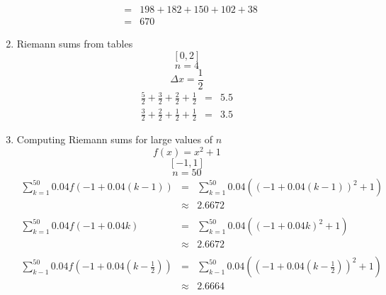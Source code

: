 \documentclass{article}
\begin{document}
\begin{enumerate}
\begin{eqnarray}
                                                      &=& 198 + 182 + 150 + 102 + 38 \\
                                                      &=& 670
            \end{eqnarray}
        \item Riemann sums from tables
            $$[0,2]$$
            $$n = 4$$
            $$\Delta{x} = \frac{1}{2}$$
            \begin{eqnarray}
                \frac{5}{2} + \frac{3}{2} + \frac{2}{2} + \frac{1}{2} &=& 5.5 \\
                \frac{3}{2} + \frac{2}{2} + \frac{1}{2} + \frac{1}{2} &=& 3.5
            \end{eqnarray}
        \item Computing Riemann sums for large values of $n$
            $$f(x) = x^2 + 1$$
            $$[-1, 1]$$
            $$n = 50$$
            \begin{eqnarray}
                \sum_{k = 1}^{50}{0.04f\left(-1 + 0.04\left(k - 1\right)\right)} &=& \sum_{k = 1}^{50}{0.04\left(\left(-1 + 0.04\left(k - 1\right)\right)^2 + 1\right)} \\
                                                                                 &\approx& 2.6672 \\
                                                                                 \nonumber \\
                \sum_{k = 1}^{50}{0.04f\left(-1 + 0.04k\right)} &=& \sum_{k = 1}^{50}{0.04\left(\left(-1 + 0.04k\right)^2 + 1\right)} \\
                                                                &\approx& 2.6672 \\
                                                                \nonumber \\
                \sum_{k - 1}^{50}{0.04f\left(-1 + 0.04\left(k - \frac{1}{2}\right)\right)} &=& \sum_{k - 1}^{50}{0.04\left(\left(-1 + 0.04\left(k - \frac{1}{2}\right)\right)^2 + 1\right)} \\
                                                                                           &\approx& 2.6664
            \end{eqnarray}
\end{enumerate}
\end{document}

